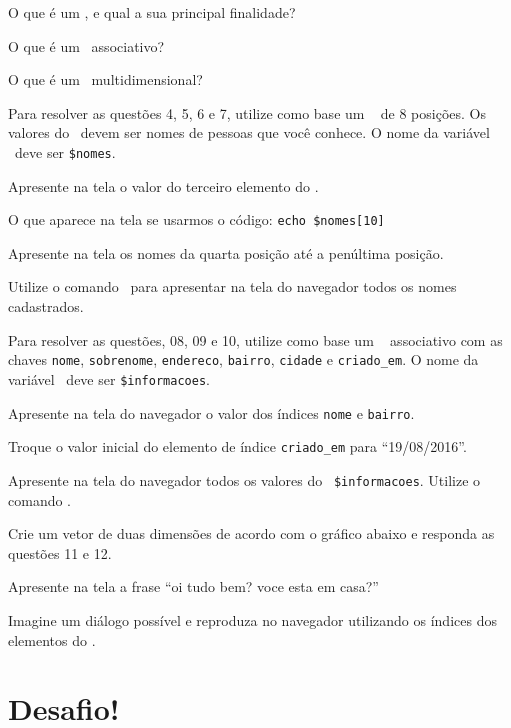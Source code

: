 \begin{description}[labelindent=30pt]
  \item [Q. 01] O que é um \tipoarray, e qual a sua principal finalidade?
  \item [Q. 02] O que é um \tipoarray~associativo?
  \item [Q. 03] O que é um \tipoarray~multidimensional?
  \item Para resolver as questões 4, 5, 6 e 7, utilize como base um \tipoarray~
  de 8 posições. Os valores do \tipoarray~devem ser nomes de pessoas que você conhece. 
  O nome da variável \tipoarray~deve ser \texttt{\$nomes}.
  \item [Q. 04] Apresente na tela o valor do terceiro elemento do \tipoarray.
  \item [Q. 05] O que aparece na tela se usarmos o código: \texttt{echo \$nomes[10]}
  \item [Q. 06] Apresente na tela os nomes da quarta posição até a penúltima posição.
  \item [Q. 07] Utilize o comando \comandoforeach~para apresentar na tela do navegador
  todos os nomes cadastrados.
  \item Para resolver as questões, 08, 09 e 10, utilize como base um \tipoarray~ associativo
  com as chaves \texttt{nome}, \texttt{sobrenome}, \texttt{endereco}, \texttt{bairro},
  \texttt{cidade} e \texttt{criado\_em}. O nome da variável \tipoarray~deve ser \texttt{\$informacoes}.
  \item [Q. 08] Apresente na tela do navegador o valor dos índices \texttt{nome} e \texttt{bairro}.
  \item [Q. 09] Troque o valor inicial do elemento de índice \texttt{criado\_em} para ``19/08/2016''.
  \item [Q. 10] Apresente na tela do navegador todos os valores do \tipoarray~\texttt{\$informacoes}.
  Utilize o comando \comandoforeach.
  \item Crie um vetor de duas dimensões de acordo com o gráfico abaixo e responda as questões 11 e 12.
  
  \item [Q. 11] Apresente na tela a frase ``oi tudo bem? voce esta em casa?'' 
  \item [Q. 12] Imagine um diálogo possível e reproduza no navegador utilizando os índices dos
  elementos do \tipoarray.
\end{description}

\section{Desafio!}
\label{cap6-desafio}
